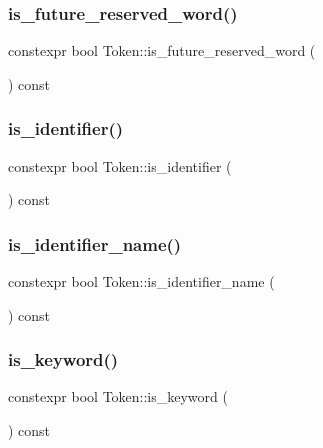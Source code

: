 \subsubsection{\texorpdfstring{is\+\_\+future\+\_\+reserved\+\_\+word()}{is\_future\_reserved\_word()}}
{\footnotesize\ttfamily constexpr bool Token\+::is\+\_\+future\+\_\+reserved\+\_\+word (\begin{DoxyParamCaption}{ }\end{DoxyParamCaption}) const\hspace{0.3cm}{\ttfamily [inline]}}

\mbox{\label{class_token_a2a0f46fcb0c3e59b30e99739ff948fca}} 
\subsubsection{\texorpdfstring{is\+\_\+identifier()}{is\_identifier()}}
{\footnotesize\ttfamily constexpr bool Token\+::is\+\_\+identifier (\begin{DoxyParamCaption}{ }\end{DoxyParamCaption}) const\hspace{0.3cm}{\ttfamily [inline]}}

\mbox{\label{class_token_a93c80aa20d87a2bc8111a77507e9b582}} 
\subsubsection{\texorpdfstring{is\+\_\+identifier\+\_\+name()}{is\_identifier\_name()}}
{\footnotesize\ttfamily constexpr bool Token\+::is\+\_\+identifier\+\_\+name (\begin{DoxyParamCaption}{ }\end{DoxyParamCaption}) const\hspace{0.3cm}{\ttfamily [inline]}}

\mbox{\label{class_token_a032c6c9570a68d806f22b679ebe0f59a}} 
\subsubsection{\texorpdfstring{is\+\_\+keyword()}{is\_keyword()}}
{\footnotesize\ttfamily constexpr bool Token\+::is\+\_\+keyword (\begin{DoxyParamCaption}{ }\end{DoxyParamCaption}) const\hspace{0.3cm}{\ttfamily [inline]}}


